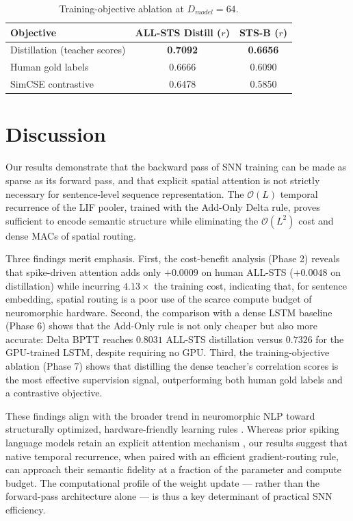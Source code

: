 \documentclass[runningheads]{llncs}
\begin{document}
\begin{table}[t]
\caption{Training-objective ablation at $D_{model}=64$.}\label{tab:objective_ablation}
\centering
\begin{tabular}{lcc}
\toprule
\textbf{Objective} & \textbf{ALL-STS Distill ($r$)} & \textbf{STS-B ($r$)} \\
\midrule
Distillation (teacher scores) & \textbf{0.7092} & \textbf{0.6656} \\
Human gold labels & 0.6666 & 0.6090 \\
SimCSE contrastive & 0.6478 & 0.5850 \\
\bottomrule
\end{tabular}
\end{table}

\section{Discussion}
Our results demonstrate that the backward pass of SNN training can be made as sparse as its forward pass, and that explicit spatial attention is not strictly necessary for sentence-level sequence representation. The $\mathcal{O}(L)$ temporal recurrence of the LIF pooler, trained with the Add-Only Delta rule, proves sufficient to encode semantic structure while eliminating the $\mathcal{O}(L^2)$ cost and dense MACs of spatial routing.

Three findings merit emphasis. First, the cost-benefit analysis (Phase 2) reveals that spike-driven attention adds only $+0.0009$ on human ALL-STS ($+0.0048$ on distillation) while incurring $4.13\times$ the training cost, indicating that, for sentence embedding, spatial routing is a poor use of the scarce compute budget of neuromorphic hardware. Second, the comparison with a dense LSTM baseline (Phase 6) shows that the Add-Only rule is not only cheaper but also more accurate: Delta BPTT reaches $0.8031$ ALL-STS distillation versus $0.7326$ for the GPU-trained LSTM, despite requiring no GPU. Third, the training-objective ablation (Phase 7) shows that distilling the dense teacher's correlation scores is the most effective supervision signal, outperforming both human gold labels and a contrastive objective.

These findings align with the broader trend in neuromorphic NLP toward structurally optimized, hardware-friendly learning rules \cite{neftci2019surrogate,zhou2023spikformer}. Whereas prior spiking language models retain an explicit attention mechanism \cite{zhou2023spikformer,zhu2023spikegpt,bal2024spikingbert}, our results suggest that native temporal recurrence, when paired with an efficient gradient-routing rule, can approach their semantic fidelity at a fraction of the parameter and compute budget. The computational profile of the weight update --- rather than the forward-pass architecture alone --- is thus a key determinant of practical SNN efficiency.
\end{document}
